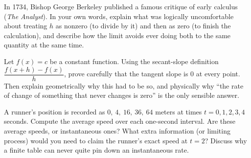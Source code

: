 \begin{exercise}
In 1734, Bishop George Berkeley published a famous critique of early calculus (\emph{The Analyst}). In your
own words, explain what was logically uncomfortable about treating $h$ as nonzero
(to divide by it) and then as zero (to finish the calculation), and describe how
the limit avoids ever doing both to the same quantity at the same time.
\end{exercise}

\begin{exercise}
Let $f(x) = c$ be a constant function. Using the secant-slope definition
$\dfrac{f(x+h)-f(x)}{h}$, prove carefully that the tangent slope is $0$ at every
point. Then explain geometrically why this had to be so, and physically why ``the
rate of change of something that never changes is zero'' is the only sensible
answer.
\end{exercise}

\begin{exercise}
A runner's position is recorded as $0,\ 4,\ 16,\ 36,\ 64$ meters at times
$t = 0,1,2,3,4$ seconds. Compute the average speed over each one-second interval.
Are these average speeds, or instantaneous ones? What extra information (or
limiting process) would you need to claim the runner's exact speed at $t = 2$?
Discuss why a finite table can never quite pin down an instantaneous rate.
\end{exercise}
